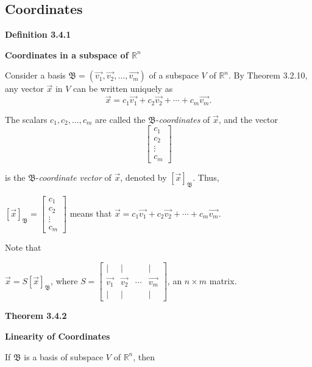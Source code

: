\subsection{Coordinates}
\textbf{Definition 3.4.1}\\
\par\noindent\textbf{Coordinates in a subspace of $\mathbb{R}^{n}$}
\par\noindent Consider a basis $\mathfrak{B}=(\vec{v_{1}},\vec{v_{2}},\ldots{},\vec{v_{m}})$ of a subspace $V$ of $\mathbb{R}^n$. By Theorem 3.2.10, any vector $\vec{x}$ in $V$ can be written uniquely as
\[\vec{x}=c_{1}\vec{v_{1}}+c_{2}\vec{v_{2}}+\cdots{}+c_{m}\vec{v_{m}}.\]
\par\noindent The scalars $c_{1},c_{2},\ldots{},c_{m}$ are called the $\mathfrak{B}$-\textit{coordinates} of $\vec{x}$, and the vector
\[\left[\begin{array}{c}c_{1}\\ c_{2}\\ \vdots{}\\ c_{m}\end{array}\right]\]
\par\noindent is the $\mathfrak{B}$-\textit{coordinate vector} of $\vec{x}$, denoted by $[\vec{x}]_{\mathfrak{B}}$. Thus,
\par\noindent\begin{center} $\displaystyle[\vec{x}]_{\mathfrak{B}}=\left[\begin{array}{c}c_{1}\\ c_{2}\\ \vdots{}\\ c_{m}\end{array}\right]$ means that $\vec{x}=c_{1}\vec{v_{1}}+c_{2}\vec{v_{2}}+\cdots{}+c_{m}\vec{v_{m}}$.\end{center}
\par\noindent Note that
\par\noindent\begin{center} $\displaystyle\vec{x}=S[\vec{x}]_{\mathfrak{B}}$, where $\displaystyle S=\left[\begin{array}{cccc}|&|& &|\\ \vec{v_{1}}&\vec{v_{2}}&\cdots{}&\vec{v_{m}}\\ |&|& &|\end{array}\right]$, an $n\times{}m$ matrix.\end{center}
\textbf{Theorem 3.4.2}\\
\par\noindent\textbf{Linearity of Coordinates}
\par\noindent If $\mathfrak{B}$ is a basis of subspace $V$ of $\mathbb{R}^{n}$, then
